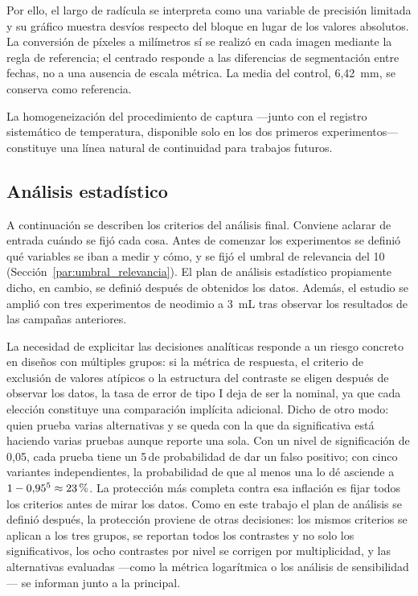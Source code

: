Por ello, el largo de radícula se interpreta como una variable de precisión limitada y su gráfico muestra desvíos respecto del bloque en lugar de los valores absolutos. La conversión de píxeles a milímetros sí se realizó en cada imagen mediante la regla de referencia; el centrado responde a las diferencias de segmentación entre fechas, no a una ausencia de escala métrica. La media del control, 6{,}42~mm, se conserva como referencia.

La homogeneización del procedimiento de captura ---junto con el registro sistemático de temperatura, disponible solo en los dos primeros experimentos--- constituye una línea natural de continuidad para trabajos futuros.

\subsection{Análisis estadístico}
\label{subsec:plan_analisis}

A continuación se describen los criterios del análisis final. Conviene aclarar de entrada cuándo se fijó cada cosa. Antes de comenzar los experimentos se definió qué variables se iban a medir y cómo, y se fijó el umbral de relevancia del 10\,\pct (Sección~\ref{par:umbral_relevancia}). El plan de análisis estadístico propiamente dicho, en cambio, se definió después de obtenidos los datos. Además, el estudio se amplió con tres experimentos de neodimio a 3~mL tras observar los resultados de las campañas anteriores.

La necesidad de explicitar las decisiones analíticas responde a un riesgo concreto en diseños con múltiples grupos: si la métrica de respuesta, el criterio de exclusión de valores atípicos o la estructura del contraste se eligen después de observar los datos, la tasa de error de tipo I deja de ser la nominal, ya que cada elección constituye una comparación implícita adicional. Dicho de otro modo: quien prueba varias alternativas y se queda con la que da significativa está haciendo varias pruebas aunque reporte una sola. Con un nivel de significación de 0,05, cada prueba tiene un 5\,\pct de probabilidad de dar un falso positivo; con cinco variantes independientes, la probabilidad de que al menos una lo dé asciende a \(1-0{,}95^5 \approx 23\,\text{\%}\). La protección más completa contra esa inflación es fijar todos los criterios antes de mirar los datos. Como en este trabajo el plan de análisis se definió después, la protección proviene de otras decisiones: los mismos criterios se aplican a los tres grupos, se reportan todos los contrastes y no solo los significativos, los ocho contrastes por nivel se corrigen por multiplicidad, y las alternativas evaluadas ---como la métrica logarítmica o los análisis de sensibilidad--- se informan junto a la principal.

